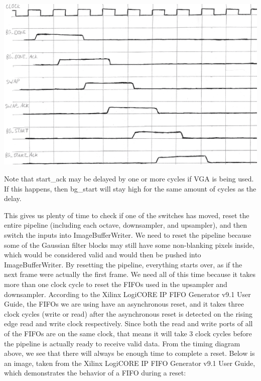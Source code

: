 \documentclass[12pt]{article}
\begin{document}
\includegraphics[width=\textwidth]{processed_image_pngs/timing_3.png}

Note that start\_ack may be delayed by one or more cycles if VGA is being used. If this happens, then bg\_start will stay high for the same amount of cycles as the delay.

This gives us plenty of time to check if one of the switches has moved, reset 
the entire pipeline (including each octave, downsampler, and upsampler), and 
then switch the inputs into ImageBufferWriter. We need to reset the pipeline 
because some of the Gaussian filter blocks may still have some non-blanking 
pixels inside, which would be considered valid and would then be pushed into 
ImageBufferWriter. By resetting the pipeline, everything starts over, as if the 
next frame were actually the first frame. We need all of this time because it 
takes more than one clock cycle to reset the FIFOs used in the upsampler and 
downsampler. According to the Xilinx LogiCORE IP FIFO Generator v9.1 User Guide, 
the FIFOs we are using have an asynchronous reset, and it takes three clock 
cycles (write or read) after the asynchronous reset is detected on the rising 
edge read and write clock respectively. Since both the read and write ports 
of all of the FIFOs are on the same clock, that means it will take 3 clock 
cycles before the pipeline is actually ready to receive valid data. From the 
timing diagram above, we see that there will always be enough time to complete 
a reset. Below is an image, taken from the Xilinx LogiCORE IP FIFO Generator 
v9.1 User Guide, which demonstrates the behavior of a FIFO during a reset: 
\end{document}
